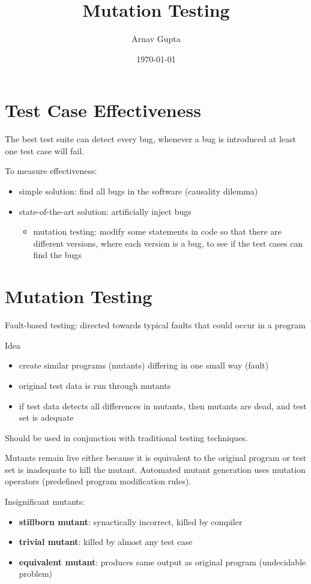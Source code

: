 \documentclass[11pt]{article}
\author{Arnav Gupta}
\date{\today}
\title{Mutation Testing}
\begin{document}
\maketitle
\tableofcontents

\section{Test Case Effectiveness}
\label{sec:orge75f001}
The best test suite can detect every bug, whenever a bug is introduced
at least one test case will fail.

To measure effectiveness:
\begin{itemize}
\item simple solution: find all bugs in the software (causality dilemma)
\item state-of-the-art solution: artificially inject bugs
\begin{itemize}
\item mutation testing: modify some statements in code so that there
are different versions, where each version is a bug, to see if
the test cases can find the bugs
\end{itemize}
\end{itemize}
\section{Mutation Testing}
\label{sec:orgf17829d}
Fault-based testing: directed towards typical faults that could occur
in a program

Idea
\begin{itemize}
\item create similar programs (mutants) differing in one small way (fault)
\item original test data is run through mutants
\item if test data detects all differences in mutants, then mutants
are dead, and test set is adequate
\end{itemize}

Should be used in conjunction with traditional testing techniques.

Mutants remain live either because it is equivalent to the original
program or test set is inadequate to kill the mutant.
Automated mutant generation uses mutation operators (predefined
program modification rules).

Insignificant mutants:
\begin{itemize}
\item \textbf{stillborn mutant}: synactically incorrect, killed by compiler
\item \textbf{trivial mutant}: killed by almost any test case
\item \textbf{equivalent mutant}: produces same output as original program
(undecidable problem)
\end{itemize}
\end{document}
